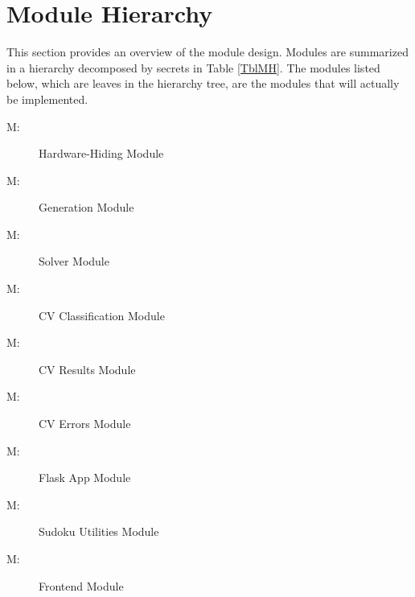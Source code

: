 \documentclass[12pt, titlepage]{article}
\newcounter{mnum}
\newcommand{\mthemnum}{M\themnum}
\begin{document}
\section{Module Hierarchy} \label{SecMH}

This section provides an overview of the module design. Modules are summarized
in a hierarchy decomposed by secrets in Table \ref{TblMH}. The modules listed
below, which are leaves in the hierarchy tree, are the modules that will
actually be implemented.

\begin{description}
\item [ \mthemnum \label{mHH}:] Hardware-Hiding Module\\
\item [ \mthemnum \label{mGM}:] Generation Module\\ 
\item [ \mthemnum \label{mSM}:] Solver Module \\
\item [ \mthemnum \label{mCCM}:] CV Classification  Module \\
\item [ \mthemnum \label{mCRM}:] CV Results Module \\
\item [ \mthemnum \label{mCEM}:] CV Errors Module \\
\item [ \mthemnum \label{mFAM}:] Flask App Module \\
\item [ \mthemnum \label{mSUM}:] Sudoku Utilities 
Module \\
\item [ \mthemnum \label{mFM}:] Frontend 
Module \\
\end{description}
\end{document}
